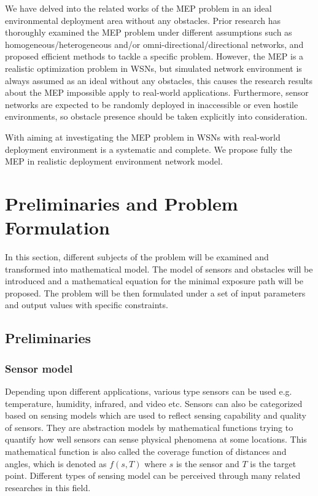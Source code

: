 \documentclass[final]{elsarticle}
\begin{document}
We have delved into the related works of the MEP problem in an ideal environmental deployment area without any obstacles. Prior research has thoroughly examined the MEP problem under different assumptions such as homogeneous/heterogeneous and/or omni-directional/directional networks, and proposed efficient methods to tackle a specific problem. However, the MEP is a realistic optimization problem in WSNs, but simulated network environment is always assumed as an ideal without any obstacles, this causes the research results about the MEP impossible apply to real-world applications. Furthermore, sensor networks are expected to be randomly deployed in inaccessible or even hostile environments, so obstacle presence should be taken explicitly into consideration.

With aiming at investigating the MEP problem in WSNs with real-world deployment environment is a systematic and complete. We propose fully the MEP in realistic deployment environment network model. 
\section{Preliminaries and Problem Formulation}
In this section, different subjects of the problem will be examined and transformed into mathematical model. The model of sensors and obstacles will be introduced and a mathematical equation for the minimal exposure path will be proposed. The problem will be then formulated under a set of input parameters and output values with specific constraints.
\subsection{Preliminaries}
\subsubsection{Sensor model}
Depending upon different applications, various type sensors can be used e.g. temperature, humidity, infrared, and video etc. Sensors can also be categorized based on sensing models which are used to reflect sensing capability and quality of sensors. They are abstraction models by mathematical functions trying to quantify how well sensors can sense physical phenomena at some locations. This mathematical function is also called the coverage function of distances and angles, which is denoted as $f(s, T)$ where $ s $ is the sensor and $ T $ is the target point. Different types of sensing model can be perceived through many related researches in this field.
\end{document}
